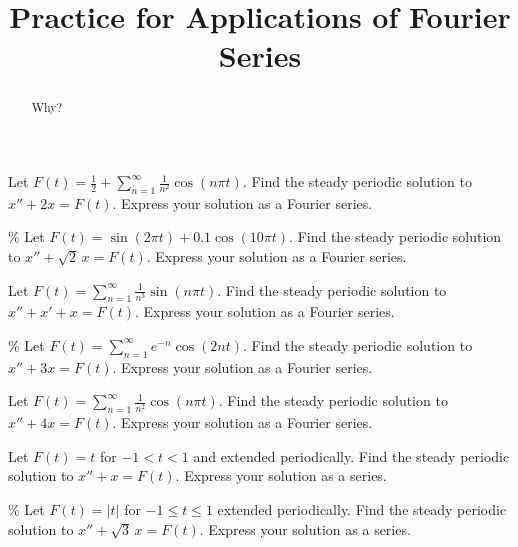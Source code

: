 \documentclass{ximera}
\title{Practice for Applications of Fourier Series}
\begin{document}
\begin{abstract}
Why?
\end{abstract}
\maketitle



\begin{exercise}
    Let $F(t) = \frac{1}{2} + \sum_{n=1}^\infty \frac{1}{n^2} \cos (n \pi t)$. Find the steady periodic solution to $x'' + 2 x = F(t)$.  Express your solution as a Fourier series.
\end{exercise}

\begin{exercise}\%
    Let $F(t) = \sin(2\pi t) + 0.1 \cos(10 \pi t)$. Find the steady periodic solution to $x'' + \sqrt{2}\, x = F(t)$. Express your solution as a Fourier series.
\end{exercise}

\begin{exercise}
    Let $F(t) = \sum_{n=1}^\infty \frac{1}{n^3} \sin (n \pi t)$.  Find the steady periodic solution to $x'' + x' + x = F(t)$.  Express your solution as a Fourier series.
\end{exercise}

\begin{exercise}\%
    Let $F(t) = \sum_{n=1}^\infty e^{-n} \cos(2 n t)$. Find the steady periodic solution to $x'' + 3 x = F(t)$. Express your solution as a Fourier series.
\end{exercise}


\begin{exercise}
    Let $F(t) = \sum_{n=1}^\infty \frac{1}{n^2} \cos (n \pi t)$.  Find the steady periodic solution to $x'' + 4 x = F(t)$.  Express your solution as a Fourier series.
\end{exercise}

\begin{exercise}
    Let $F(t) = t$ for $-1 < t < 1$ and extended periodically. Find the steady periodic solution to $x'' + x = F(t)$.  Express your solution as a series.
\end{exercise}

\begin{exercise}\%
    Let $F(t) = \lvert t \rvert$ for $-1 \leq t \leq 1$ extended periodically. Find the steady periodic solution to $x'' + \sqrt{3}\, x = F(t)$. Express your solution as a series.
\end{exercise}
\end{document}
